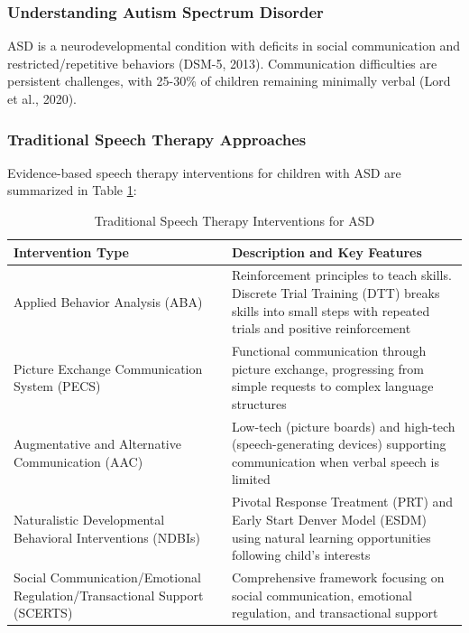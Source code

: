 \documentclass[12pt,a4paper]{article}
\begin{document}
\subsubsection{Understanding Autism Spectrum Disorder}

ASD is a neurodevelopmental condition with deficits in social communication and restricted/repetitive behaviors (DSM-5, 2013). Communication difficulties are persistent challenges, with 25-30\% of children remaining minimally verbal (Lord et al., 2020).

\subsubsection{Traditional Speech Therapy Approaches}

Evidence-based speech therapy interventions for children with ASD are summarized in Table \ref{tab:interventions}:

\begin{table}[H]
\centering
\caption{Traditional Speech Therapy Interventions for ASD}
\label{tab:interventions}
\small
\begin{tabular}{p{4cm}p{9.5cm}}
\toprule
\textbf{Intervention Type} & \textbf{Description and Key Features} \\
\midrule
Applied Behavior Analysis (ABA) & Reinforcement principles to teach skills. Discrete Trial Training (DTT) breaks skills into small steps with repeated trials and positive reinforcement \\
\hline
Picture Exchange Communication System (PECS) & Functional communication through picture exchange, progressing from simple requests to complex language structures \\
\hline
Augmentative and Alternative Communication (AAC) & Low-tech (picture boards) and high-tech (speech-generating devices) supporting communication when verbal speech is limited \\
\hline
Naturalistic Developmental Behavioral Interventions (NDBIs) & Pivotal Response Treatment (PRT) and Early Start Denver Model (ESDM) using natural learning opportunities following child's interests \\
\hline
Social Communication/Emotional Regulation/Transactional Support (SCERTS) & Comprehensive framework focusing on social communication, emotional regulation, and transactional support \\
\bottomrule
\end{tabular}
\end{table}
\end{document}
